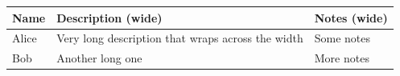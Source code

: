 \documentclass{article}
\begin{document}
\begin{tabularx}{\linewidth}{|l|X|X|}
  \hline
  Name & Description (wide) & Notes (wide) \\
  \hline
  Alice & Very long description that wraps across the width & Some notes \\
  Bob & Another long one & More notes \\
  \hline
\end{tabularx}
\end{document}
